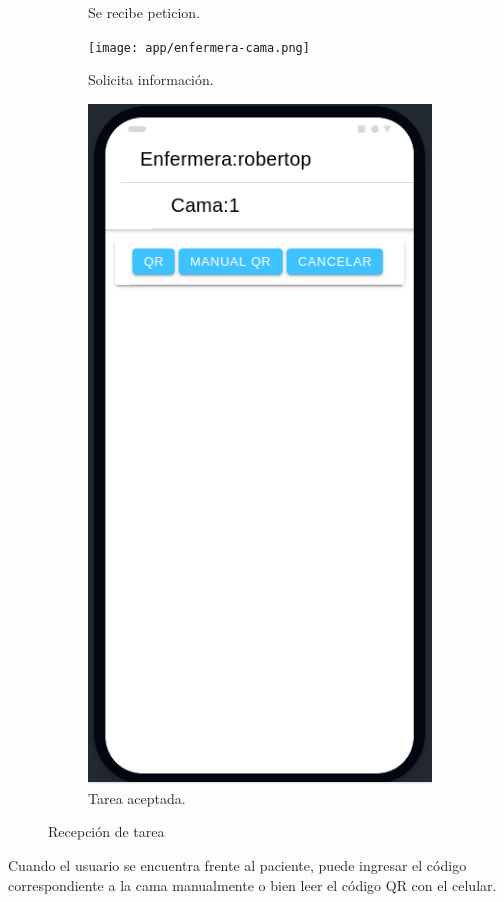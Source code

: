 \begin{figure}[!htpb]
\begin{subfigure}[b]{0.3\textwidth}
         \caption{Se recibe peticion.}
         \label{fig_2:1de3}
     \end{subfigure}
     \hfill
     \begin{subfigure}[b]{0.3\textwidth}
         \centering
         \texttt{[image: app/enfermera-cama.png]}
         \caption{Solicita información.}
         \label{fig_2:2de3}
     \end{subfigure}
     \hfill
     \begin{subfigure}[b]{0.3\textwidth}
         \centering
         \includegraphics[width=.95\textwidth]{./Figures/app/yendo-enfermera.png}
         \caption{Tarea aceptada.}
         \label{fig_2:3de3}
     \end{subfigure}
        \caption{Recepción de tarea}
        \label{fig_2:three graphs}
\end{figure}
\pagebreak
Cuando el usuario se encuentra frente al paciente, puede ingresar el código correspondiente a la cama manualmente o bien leer el código QR con el celular.



